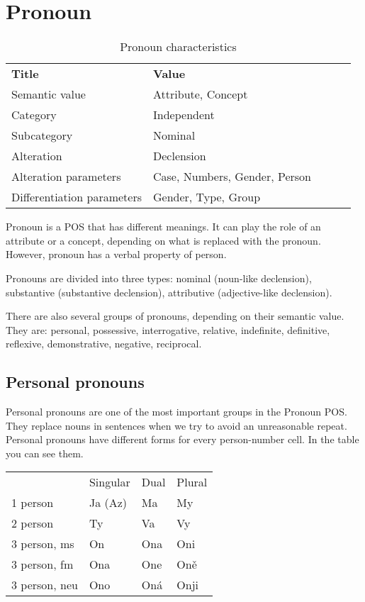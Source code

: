 \section{Pronoun}

\begin{table}[h]
	\caption{Pronoun characteristics}
	\begin{tabular}{lllll}
		\textbf{Title}              & \textbf{Value}               \\
		Semantic value              & Attribute, Concept           \\
		Category                    & Independent                  \\
		Subcategory                 & Nominal                      \\
		Alteration                  & Declension                   \\
		Alteration parameters       & Case, Numbers, Gender, Person\\
		Differentiation parameters  & Gender, Type, Group
	\end{tabular}
\end{table}

Pronoun is a POS that has different meanings. It can play the role of an attribute or a concept, depending on what is replaced with the pronoun. However, pronoun has a verbal property of person.

Pronouns are divided into three types: nominal (noun-like declension), substantive (substantive declension), attributive (adjective-like declension).

There are also several groups of pronouns, depending on their semantic value. They are: personal, possessive, interrogative, relative, indefinite, definitive, reflexive, demonstrative, negative, reciprocal.

\subsection{Personal pronouns}

Personal pronouns are one of the most important groups in the Pronoun POS. They replace nouns in sentences when we try to avoid an unreasonable repeat. Personal pronouns have different forms for every person-number cell. In the table you can see them.

\begin{table}
	\begin{tabular}{llll}
		& Singular & Dual & Plural \\
		1 person & Ja (Az) & Ma & My \\
		2 person & Ty & Va & Vy \\
		3 person, ms & On & Ona & Oni \\
		3 person, fm & Ona & One & Oně \\
		3 person, neu & Ono & Oná & Onji
	\end{tabular}
\end{table}

